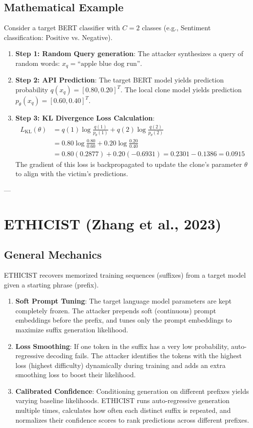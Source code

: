 \documentclass{article}
\begin{document}
\subsection{Mathematical Example}
Consider a target BERT classifier with $C=2$ classes (e.g., Sentiment classification: Positive vs. Negative).
\begin{enumerate}
    \item \textbf{Step 1: Random Query generation}: The attacker synthesizes a query of random words: $x_q = \text{``apple blue dog run''}$.
    \item \textbf{Step 2: API Prediction}: The target BERT model yields prediction probability $q(x_q) = [0.80, 0.20]^T$. The local clone model yields prediction $p_{\theta}(x_q) = [0.60, 0.40]^T$.
    \item \textbf{Step 3: KL Divergence Loss Calculation}:
    \begin{align*}
        L_{\text{KL}}(\theta) &= q(1) \log \frac{q(1)}{p_{\theta}(1)} + q(2) \log \frac{q(2)}{p_{\theta}(2)} \\
        &= 0.80 \log \frac{0.80}{0.60} + 0.20 \log \frac{0.20}{0.40} \\
        &= 0.80(0.2877) + 0.20(-0.6931) = 0.2301 - 0.1386 = 0.0915
    \end{align*}
    The gradient of this loss is backpropagated to update the clone's parameter $\theta$ to align with the victim's predictions.
\end{enumerate}

---

\section{ETHICIST (Zhang et al., 2023)}

\subsection{General Mechanics}
ETHICIST recovers memorized training sequences (suffixes) from a target model given a starting phrase (prefix).
\begin{enumerate}
    \item \textbf{Soft Prompt Tuning}: The target language model parameters are kept completely frozen. The attacker prepends soft (continuous) prompt embeddings before the prefix, and tunes only the prompt embeddings to maximize suffix generation likelihood.
    \item \textbf{Loss Smoothing}: If one token in the suffix has a very low probability, auto-regressive decoding fails. The attacker identifies the tokens with the highest loss (highest difficulty) dynamically during training and adds an extra smoothing loss to boost their likelihood.
    \item \textbf{Calibrated Confidence}: Conditioning generation on different prefixes yields varying baseline likelihoods. ETHICIST runs auto-regressive generation multiple times, calculates how often each distinct suffix is repeated, and normalizes their confidence scores to rank predictions across different prefixes.
\end{enumerate}
\end{document}
